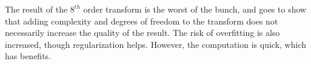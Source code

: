 \documentclass{article}
\begin{document}
The result of the $8^{th}$ order transform is the worst of the bunch, and goes to show that
adding complexity and degrees of freedom to the transform does not necessarily increase the
quality of the result. The risk of overfitting is also increased, though regularization helps.
However, the computation is quick, which has benefits. 
\end{document}
